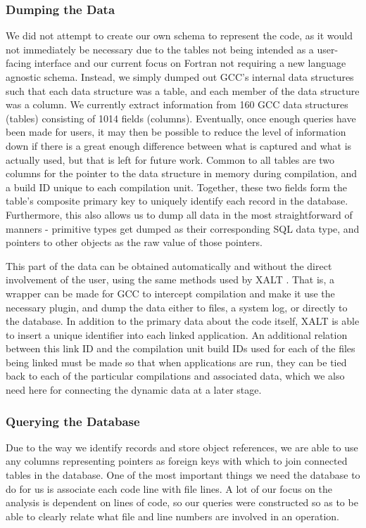 \subsubsection{Dumping the Data}
We did not attempt to create our own schema to represent the code, as it would not immediately be necessary due to the tables not being intended as a user-facing interface and our current focus on Fortran not requiring a new language agnostic schema.
Instead, we simply dumped out \ac{GCC}'s internal data structures such that each data structure was a table, and each member of the data structure was a column.
We currently extract information from 160 \acs{GCC} data structures (tables) consisting of 1014 fields (columns).
Eventually, once enough queries have been made for users, it may then be possible to reduce the level of information down if there is a great enough difference between what is captured and what is actually used, but that is left for future work.
Common to all tables are two columns for the pointer to the data structure in memory during compilation, and a build ID unique to each compilation unit.
Together, these two fields form the table's composite primary key to uniquely identify each record in the database.
Furthermore, this also allows us to dump all data in the most straightforward of manners - primitive types get dumped as their corresponding \acs{SQL} data type, and pointers to other objects as the raw value of those pointers.

This part of the data can be obtained automatically and without the direct involvement of the user, using the same methods used by XALT \cite{7081224}.
That is, a wrapper can be made for \ac{GCC} to intercept compilation and make it use the necessary plugin, and dump the data either to files, a system log, or directly to the database.
In addition to the primary data about the code itself, XALT is able to insert a unique identifier into each linked application.
An additional relation between this link ID and the compilation unit build IDs used for each of the files being linked must be made so that when applications are run, they can be tied back to each of the particular compilations and associated data, which we also need here for connecting the dynamic data at a later stage.
\subsubsection{Querying the Database}
Due to the way we identify records and store object references, we are able to use any columns representing pointers as foreign keys with which to join connected tables in the database.
One of the most important things we need the database to do for us is associate each code line with file lines.
A lot of our focus on the analysis is dependent on lines of code, so our queries were constructed so as to be able to clearly relate what file and line numbers are involved in an operation.

